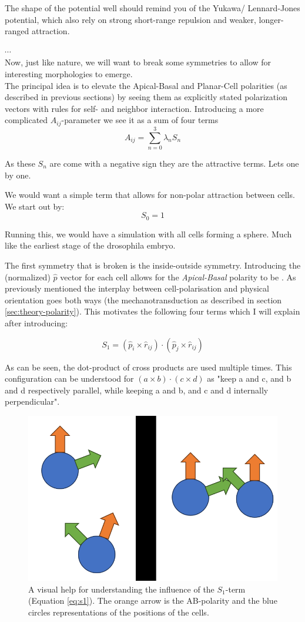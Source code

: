 The shape of the potential well should remind you of the Yukawa/ Lennard-Jones potential, which also rely on strong short-range repulsion and weaker, longer-ranged attraction.

$\cdots$\\
Now, just like nature, we will want to break some symmetries to allow for interesting morphologies to emerge.\\
The principal idea is to elevate the Apical-Basal and Planar-Cell polarities (as described in previous sections) by seeing them as explicitly stated polarization vectors with rules for self- and neighbor interaction.
Introducing a more complicated $A_{ij}$-parameter we see it as a sum of four terms
\begin{equation}
    A_{ij}=\sum_{n=0}^{3}\lambda_n  S_n
\end{equation}

As these $S_n$ are come with a negative sign they are the attractive terms.
Lets one by one.

We would want a simple term that allows for non-polar attraction between cells. We start out by: 
\begin{equation*}
    S_0 = 1
\end{equation*}

Running this, we would have a simulation with all cells forming a sphere. Much like the earliest stage of the drosophila embryo.

The first symmetry that is broken is the inside-outside symmetry. Introducing the (normalized) $\hat{p}$ vector for each cell allows for the \textit{Apical-Basal} polarity to be .
As previously mentioned the interplay between cell-polarisation and physical orientation goes both ways (the mechanotransduction as described in section \ref{sec:theory-polarity}). This motivates the following four terms which I will explain after introducing:

\begin{equation*}
    S_1=\left(\hat{p}_i \times \hat{r}_{i j}\right) \cdot\left(\hat{p}_j \times \hat{r}_{i j}\right)
\end{equation*}


As can be seen, the dot-product of cross products are used multiple times. This configuration can be understood for $\left(a \times b\right) \cdot\left(c \times d\right)$ as "keep a and c, and b and d respectively parallel, while keeping a and b, and c and d internally perpendicular".  

\begin{figure}[H]
    \centering
    \includegraphics[width=0.3\linewidth]{chapters/Theory/figures/explainS1.png}
    \caption{A visual help for understanding the influence of the $S_1$-term (Equation \ref{eq:s1}). The orange arrow is the AB-polarity and the blue circles representations of the positions of the cells.}
    \label{fig:explain-S1}
\end{figure}

